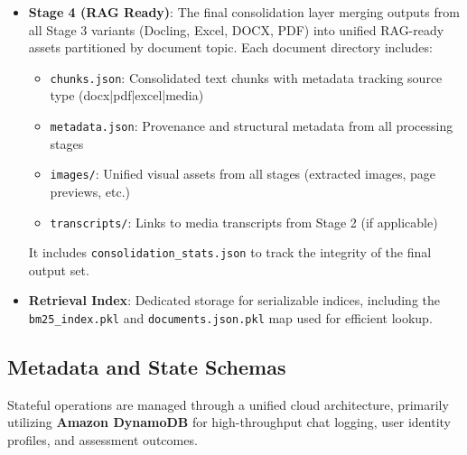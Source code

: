 \begin{itemize}
\begin{itemize}
        \begin{itemize}
            \item \textbf{Stage 3b (Excel)}: Custom XML parser with table-aware chunking (max 2000 chars), sheet metadata tracking.
            \item \textbf{Stage 3c (DOCX)}: Custom XML parser with heading-aware chunking, heading hierarchy tracking.
            \item \textbf{Stage 3d (PDF)}: Custom parser with heading-aware chunking, page-level references.
        \end{itemize}
        \item \textbf{Stage 4 (RAG Ready)}: The final consolidation layer merging outputs from all Stage 3 variants (Docling, Excel, DOCX, PDF) into unified RAG-ready assets partitioned by document topic. Each document directory includes:
        \begin{itemize}
            \item \texttt{chunks.json}: Consolidated text chunks with metadata tracking source type (docx|pdf|excel|media)
            \item \texttt{metadata.json}: Provenance and structural metadata from all processing stages
            \item \texttt{images/}: Unified visual assets from all stages (extracted images, page previews, etc.)
            \item \texttt{transcripts/}: Links to media transcripts from Stage 2 (if applicable)
        \end{itemize}
        It includes \texttt{consolidation\_stats.json} to track the integrity of the final output set.
        \item \textbf{Retrieval Index}: Dedicated storage for serializable indices, including the \texttt{bm25\_index.pkl} and \texttt{documents.json.pkl} map used for efficient lookup.
    \end{itemize}
\end{itemize}

\subsection{Metadata and State Schemas}
Stateful operations are managed through a unified cloud architecture, primarily utilizing \textbf{Amazon DynamoDB} for high-throughput chat logging, user identity profiles, and assessment outcomes. 

